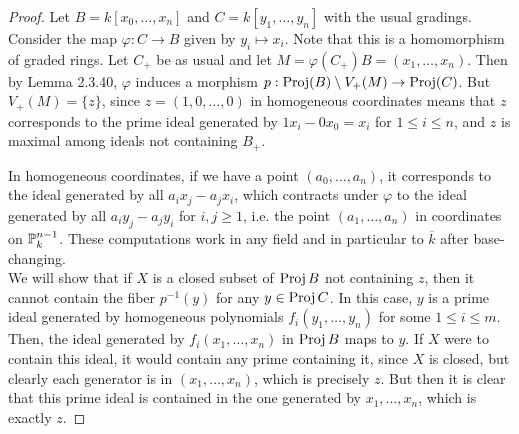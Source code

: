 \begin{proof}
	Let $B = k[x_0,\ldots,x_n]$ and $C = k[y_1,\ldots,y_n]$ with the usual gradings. Consider the map $\varphi : C \to B$ given by $y_i \mapsto x_i$. Note that this is a homomorphism of graded rings. Let $C_{+}$ be as usual and let $M = \varphi(C_{+})B = (x_1,\ldots,x_n)$. Then by Lemma 2.3.40, $\varphi$ induces a morphism $p : \operatorname{Proj}(B) \setminus V_{+}(M) \to \operatorname{Proj}(C)$. But $V_{+}(M) = \{z\}$, since $z = (1,0,\ldots,0)$ in homogeneous coordinates means that $z$ corresponds to the prime ideal generated by $1x_i-0x_0 = x_i$ for $1 \leq i \leq n$, and $z$ is maximal among ideals not containing $B_{+}$.
	
	In homogeneous coordinates, if we have a point $(a_0,\ldots,a_n)$, it corresponds to the ideal generated by all $a_ix_j-a_jx_i$, which contracts under $\varphi$ to the ideal generated by all $a_iy_j-a_jy_i$ for $i,j \geq 1$, i.e. the point $(a_1,\ldots,a_n)$ in coordinates on $\mathbb{P}_k^{n-1}$. These computations work in any field and in particular to $\overline{k}$ after base-changing. \\
	
	We will show that if $X$ is a closed subset of $\operatorname{Proj} B$ not containing $z$, then it cannot contain the fiber $p^{-1}(y)$ for any $y \in \operatorname{Proj} C$. In this case, $y$ is a prime ideal generated by homogeneous polynomials $f_i(y_1,\ldots,y_n)$ for some $1 \leq i \leq m$. Then, the ideal generated by $f_i(x_1,\ldots,x_n)$ in $\operatorname{Proj} B$ maps to $y$. If $X$ were to contain this ideal, it would contain any prime containing it, since $X$ is closed, but clearly each generator is in $(x_1,\ldots,x_n)$, which is precisely $z$. But then it is clear that this prime ideal is contained in the one generated by $x_1,\ldots,x_n$, which is exactly $z$.
\end{proof}
